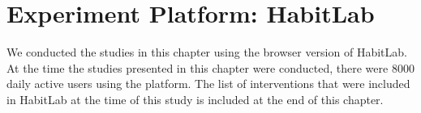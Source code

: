 \section{Experiment Platform: HabitLab}

We conducted the studies in this chapter using the browser version of HabitLab. At the time the studies presented in this chapter were conducted, there were 8000 daily active users using the platform. The list of interventions that were included in HabitLab at the time of this study is included at the end of this chapter.

